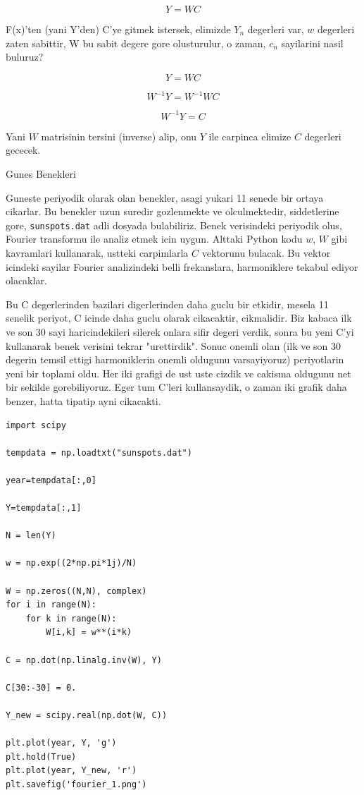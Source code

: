 \documentclass[12pt,fleqn]{article}\usepackage{../common}
\begin{document}
$$ Y = WC $$

F(x)'ten (yani Y'den) C'ye gitmek istersek, elimizde $Y_n$ degerleri var, $w$
degerleri zaten sabittir, W bu sabit degere gore olusturulur, o zaman, $c_n$
sayilarini nasil buluruz?

$$ Y = WC  $$

$$ W^{-1}Y = W^{-1}WC  $$

$$ W^{-1}Y = C $$

Yani $W$ matrisinin tersini (inverse) alip, onu $Y$ ile carpinca elimize $C$
degerleri gececek. 

Gunes Benekleri

Guneste periyodik olarak olan benekler, asagi yukari 11 senede bir ortaya
cikarlar. Bu benekler uzun suredir gozlenmekte ve olculmektedir,
siddetlerine gore, \verb!sunspots.dat! adli dosyada bulabiliriz. Benek
verisindeki periyodik olus, Fourier transformu ile analiz etmek icin
uygun. Alttaki Python kodu $w$, $W$ gibi kavramlari kullanarak, ustteki
carpimlarla $C$ vektorunu bulacak. Bu vektor icindeki sayilar Fourier
analizindeki belli frekanslara, harmoniklere tekabul ediyor olacaklar.

Bu C degerlerinden bazilari digerlerinden daha guclu bir etkidir, mesela 11
senelik periyot, C icinde daha guclu olarak cikacaktir, cikmalidir. Biz kabaca
ilk ve son 30 sayi haricindekileri silerek onlara sifir degeri verdik, sonra bu
yeni C'yi kullanarak benek verisini tekrar "urettirdik". Sonuc onemli olan
(ilk ve son 30 degerin temsil ettigi harmoniklerin onemli oldugunu varsayiyoruz)
periyotlarin yeni bir toplami oldu. Her iki grafigi de ust uste cizdik ve
cakisma oldugunu net bir sekilde gorebiliyoruz. Eger tum C'leri kullansaydik, o
zaman iki grafik daha benzer, hatta tipatip ayni cikacakti.

\begin{verbatim}
import scipy

tempdata = np.loadtxt("sunspots.dat")

year=tempdata[:,0]

Y=tempdata[:,1]

N = len(Y)

w = np.exp((2*np.pi*1j)/N)

W = np.zeros((N,N), complex)
for i in range(N):
    for k in range(N):
        W[i,k] = w**(i*k)
        
C = np.dot(np.linalg.inv(W), Y) 

C[30:-30] = 0.

Y_new = scipy.real(np.dot(W, C))

plt.plot(year, Y, 'g')
plt.hold(True)
plt.plot(year, Y_new, 'r')
plt.savefig('fourier_1.png')
\end{verbatim}
\end{document}
